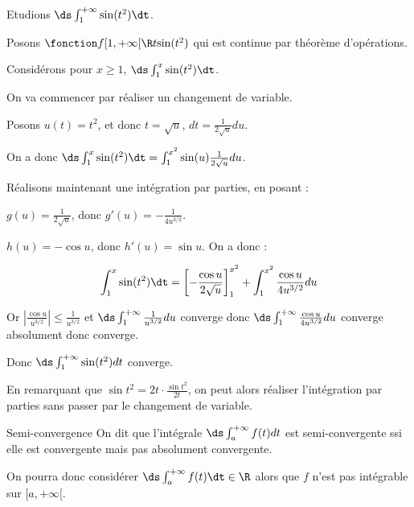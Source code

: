 \begin{exemple}
    Etudions $\ds \int_{1}^{+ \infty } \sin(t^2) \dt$.

    Posons $\fonction f {[1, + \infty[}{\R}{t}{\sin(t^2)}$ qui est continue par théorème d'opérations.

    Considérons pour $x \geqslant 1$, $\ds \int_{1 }^{x } \sin(t^2) \dt$.

    On va commencer par réaliser un changement de variable.

    Posons $u(t) = t^2$, et donc $t = \sqrt u$, $dt = \frac{1}{2 \sqrt u} du$.

    On a donc $\ds \int_{1 }^{x } \sin(t^2) \dt = \int_{1}^{x^2} \sin(u) \frac{1}{2 \sqrt u} du$.

    \avspace Réalisons maintenant une intégration par parties, en posant : 

    $g(u) = \frac{1}{2 \sqrt u}$, donc $g'(u) = - \frac{1}{4 u^{3/2}}$.

    $h(u) = - \cos u$, donc $h'(u) = \sin u$.
    On a donc :

    $$ \int_{1 }^{x } \sin(t^2) \dt = \left[ - \frac{\cos u}{2 \sqrt u} \right]_{1}^{x^2} + \int_{1}^{x^2} \frac{\cos u}{4 u^{3/2}} du $$

    Or $\left| \frac{\cos u  }{u^{3/2}} \right| \leqslant \frac{1}{u^{3/2}}$ et $\ds \int_{1}^{+ \infty} \frac{1}{u^{3/2}} du$ converge donc
    $\ds \int_{1}^{+ \infty} \frac{\cos u}{4 u^{3/2}} du$ converge absolument donc converge.

    Donc $\ds \int_{1}^{+ \infty} \sin(t^2) dt$ converge.


    En remarquant que $\sin t^2 = 2t \cdot \frac{\sin t^2}{2t}$, on peut alors réaliser l'intégration par parties 
    sans passer par le changement de variable.
\end{exemple}


\begin{definition}{Semi-convergence}{}
    On dit que l'intégrale $\ds \int_a^{+ \infty} f(t) dt$ est semi-convergente ssi elle 
    est convergente mais pas absolument convergente.

    On pourra donc considérer $\ds \int_{a }^{+ \infty}  f(t) \dt \in \R$ alors 
    que $f$ n'est pas intégrable sur $[a, + \infty[$.
\end{definition}


